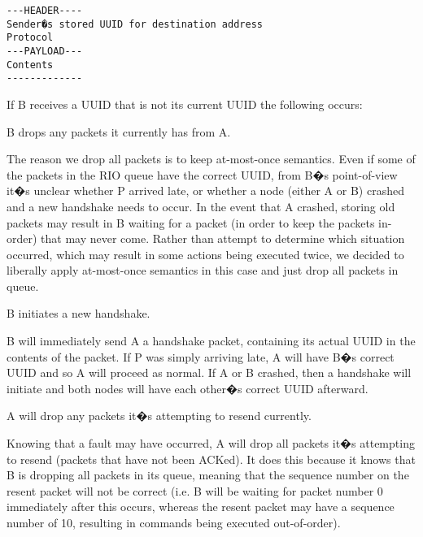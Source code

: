\documentclass[11pt]{article}
\begin{document}
\begin{verbatim}
---HEADER----
Sender�s stored UUID for destination address
Protocol
---PAYLOAD---
Contents
-------------
\end{verbatim}

If B receives a UUID that is not its current UUID the following occurs:

\begin{description}
   \item B drops any packets it currently has from A.
   \begin{description}
         \item The reason we drop all packets is to keep at-most-once semantics. Even if some of the packets in the RIO queue have the correct UUID, from B�s point-of-view it�s unclear whether P arrived late, or whether a node (either A or B) crashed and a new handshake needs to occur. In the event that A crashed, storing old packets may result in B waiting for a packet (in order to keep the packets in-order) that may never come. Rather than attempt to determine which situation occurred, which may result in some actions being executed twice, we decided to liberally apply at-most-once semantics in this case and just drop all packets in queue.
	 \end{description}
   \item B initiates a new handshake.
	 \begin{description}
         \item B will immediately send A a handshake packet, containing its actual UUID in the contents of the packet. If P was simply arriving late,     A will have B�s correct UUID and so A will proceed as normal. If A or B crashed, then a handshake will initiate and both nodes will have each other�s correct UUID afterward.
	 \end{description}
   \item A will drop any packets it�s attempting to resend currently.
	 \begin{description}
         \item Knowing that a fault may have occurred, A will drop all packets it�s attempting to resend (packets that have not been ACKed). It does this because it knows that B is dropping all packets in its queue, meaning that the sequence number on the resent packet will not be correct (i.e. B will be waiting for packet number 0 immediately after this occurs, whereas the resent packet may have a sequence number of 10, resulting in commands being executed out-of-order).
	 \end{description}
\end{description}
\end{document}
